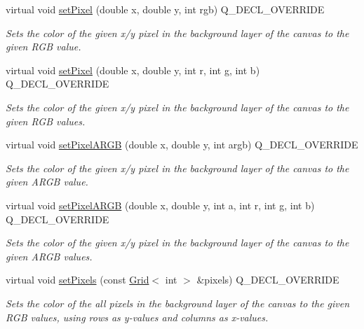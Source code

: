 \begin{DoxyCompactItemize}
virtual void \mbox{\hyperlink{classGCanvas_a1fd61df1d79ebf3db7935d5c38c222e5}{set\+Pixel}} (double x, double y, int rgb) Q\+\_\+\+D\+E\+C\+L\+\_\+\+O\+V\+E\+R\+R\+I\+DE
\begin{DoxyCompactList}\small\item\em Sets the color of the given x/y pixel in the background layer of the canvas to the given R\+GB value. \end{DoxyCompactList}\item 
virtual void \mbox{\hyperlink{classGCanvas_af9aca140f86a6de6a4368d41349dd57c}{set\+Pixel}} (double x, double y, int r, int g, int b) Q\+\_\+\+D\+E\+C\+L\+\_\+\+O\+V\+E\+R\+R\+I\+DE
\begin{DoxyCompactList}\small\item\em Sets the color of the given x/y pixel in the background layer of the canvas to the given R\+GB values. \end{DoxyCompactList}\item 
virtual void \mbox{\hyperlink{classGCanvas_a366f5f71f21ad732fd2e2fdf624f0953}{set\+Pixel\+A\+R\+GB}} (double x, double y, int argb) Q\+\_\+\+D\+E\+C\+L\+\_\+\+O\+V\+E\+R\+R\+I\+DE
\begin{DoxyCompactList}\small\item\em Sets the color of the given x/y pixel in the background layer of the canvas to the given A\+R\+GB value. \end{DoxyCompactList}\item 
virtual void \mbox{\hyperlink{classGCanvas_a3de28156839da845f8d24503c9a3b111}{set\+Pixel\+A\+R\+GB}} (double x, double y, int a, int r, int g, int b) Q\+\_\+\+D\+E\+C\+L\+\_\+\+O\+V\+E\+R\+R\+I\+DE
\begin{DoxyCompactList}\small\item\em Sets the color of the given x/y pixel in the background layer of the canvas to the given A\+R\+GB values. \end{DoxyCompactList}\item 
virtual void \mbox{\hyperlink{classGCanvas_a83fcae972f2677bf1ece054930f53162}{set\+Pixels}} (const \mbox{\hyperlink{classGrid}{Grid}}$<$ int $>$ \&pixels) Q\+\_\+\+D\+E\+C\+L\+\_\+\+O\+V\+E\+R\+R\+I\+DE
\begin{DoxyCompactList}\small\item\em Sets the color of the all pixels in the background layer of the canvas to the given R\+GB values, using rows as y-\/values and columns as x-\/values. \end{DoxyCompactList}\item 

\end{DoxyCompactItemize}
